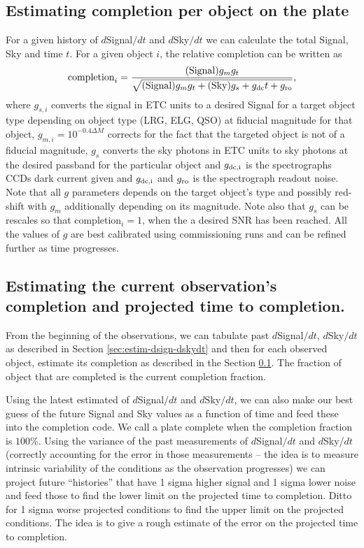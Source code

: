 \documentclass{article}
\begin{document}
\subsection{Estimating completion per object on the plate}
\label{sec:estim-compl-per}
For a given history of $d$Signal$/dt$ and $d$Sky$/dt$ we can calculate
the total Signal, Sky and time $t$.
For a given object $i$, the relative completion can be written as
\begin{equation}
  \mbox{completion}_i = \frac{(\mbox{Signal}) g_{m} g_{t}}
{\sqrt{(\mbox{Signal}) g_{m} g_{t}+(\mbox{Sky})g_{s} + g_{\rm
      dc}t+g_{\rm ro}}},
\end{equation}
where $g_{s,i}$ converts the signal in ETC units to a desired Signal
for a target object type depending on object type (LRG, ELG, QSO) at
fiducial magnitude for that object, $g_{m,i}=10^{-0.4 \Delta M}$
corrects for the fact that the targeted object is not of a fiducial
magnitude, $g_s$ converts the sky photons in ETC units to sky photons
at the desired passband for the particular object and $g_{\rm dc,i}$
is the spectrographs CCDs dark current given and $g_{\rm dc,i}$ and
$g_{\rm ro}$ is the spectrograph readout noise. Note that all $g$
parameters depends on the target object's type and possibly red-shift
with $g_m$ additionally depending on its magnitude. Note also that
$g_s$ can be rescales so that completion$_i=1$, when the a desired SNR
has been reached. All the values of $g$ are best calibrated using
commissioning runs and can be refined further as time progresses.

\subsection{Estimating the current observation's completion and
  projected time to completion.}
\label{sec:estim-curr-observ}
From the beginning of the observations, we can tabulate past
$d$Signal$/dt$, $d$Sky$/dt$ as described in Section
\ref{sec:estim-dsign-dskydt} and then for each observed object,
estimate its completion as described in the Section
\ref{sec:estim-compl-per}. The fraction of object that are completed
is the current completion fraction.

Using the latest estimated of $d$Signal$/dt$ and $d$Sky$/dt$, we can
also make our best guess of the future Signal and Sky values as a
function of time and feed these into the completion code. We call a
plate complete when the completion fraction is $100$\%.  Using the
variance of the past measurements of $d$Signal$/dt$ and $d$Sky/$dt$
(correctly accounting for the error in those measurements -- the idea
is to measure intrinsic variability of the conditions as the
observation progresses) we can project future
``histories'' that have 1 sigma higher signal and 1 sigma lower noise
and feed those to find the lower limit on the projected time to
completion. Ditto for 1 sigma worse projected conditions to find the
upper limit on the projected conditions. The idea is to give a rough
estimate of the error on the projected time to completion. 
\end{document}
